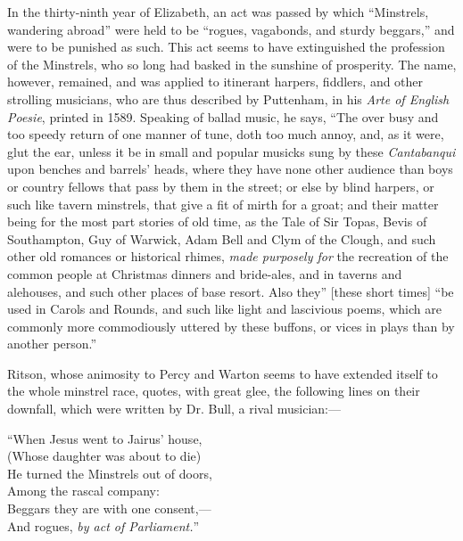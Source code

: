 In the thirty-ninth year of Elizabeth, an act was passed by which “Minstrels,
wandering abroad” were held to be “rogues, vagabonds, and sturdy beggars,”
and were to be punished as such. This act seems to have extinguished the profession
of the Minstrels, who so long had basked in the sunshine of prosperity.
The name, however, remained, and was applied to itinerant harpers, fiddlers,
and other strolling musicians, who are thus described by Puttenham, in his \textit{Arte
of English Poesie}, printed in 1589. Speaking of ballad music, he says, “The
over busy and too speedy return of one manner of tune, doth too much annoy,
and, as it were, glut the ear, unless it be in small and popular musicks sung by
these \textit{Cantabanqui} upon benches and barrels’ heads, where they have none other
audience than boys or country fellows that pass by them in the street; or else by
blind harpers, or such like tavern minstrels, that give a fit of mirth for a groat;
and their matter being for the most part stories of old time, as the Tale of Sir
Topas, Bevis of Southampton, Guy of Warwick, Adam Bell and Clym of the
Clough, and such other old romances or historical rhimes, \textit{made purposely for} the
recreation of the common people at Christmas dinners and bride-ales, and in
taverns and alehouses, and such other places of base resort. Also they” [these
short times] “be used in Carols and Rounds, and such like light and lascivious
poems, which are commonly more commodiously uttered by these buffons, or vices
in plays than by another person.”

Ritson, whose animosity to Percy and Warton seems to have extended itself
to the whole minstrel race, quotes, with great glee, the following lines on their
downfall, which were written by Dr. Bull, a rival musician:—

\settowidth{\versewidth}{He turned the Minstrels out of doors,}
\begin{scverse}
“When Jesus went to Jairus’ house,\\
(Whose daughter was about to die)\\
He turned the Minstrels out of doors,\\
Among the rascal company:\\
Beggars they are with one consent,—\\
And rogues, \textit{by act of Parliament.}”
\end{scverse}

\vfill

\centerrule
\pagebreak
\vfill
